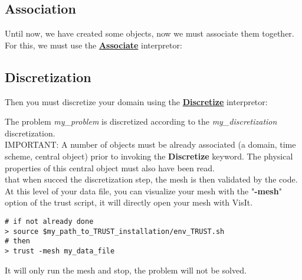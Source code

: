\subsection{Association}
Until now, we have created some objects, now we must associate them together.
For this, we must use the \href{TRUST_Reference_Manual.pdf\#associate}{\textbf{Associate}} interpretor:
    \begin{center}
    \end{center}




\subsection{Discretization}
Then you must discretize your domain using the \href{TRUST_Reference_Manual.pdf\#discretize}{\textbf{Discretize}} interpretor:
    \begin{center}
    \end{center}

The problem \textit{my\_problem} is discretized according to the \textit{my\_discretization} discretization.\\

IMPORTANT: A number of objects must be already associated (a domain, time scheme, central object) prior to invoking the \textbf{Discretize} keyword. The physical properties of this central object must also have been read.\\

\Note that when \trust succed the discretization step, the mesh is then validated by the code.\\

At this level of your data file, you can visualize your mesh with the "\textbf{-mesh}" option of the trust script, it will directly open your mesh with VisIt.
\begin{verbatim}
# if not already done
> source $my_path_to_TRUST_installation/env_TRUST.sh
# then
> trust -mesh my_data_file
\end{verbatim}
It will only run the mesh and stop, the problem will not be solved.



